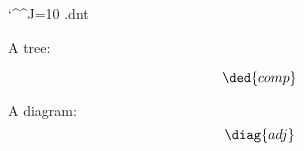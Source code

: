 \documentclass[oneside]{book}
\begin{document}
\ifluatex
  \catcode`\^^J=10
\else
  \jobname.dnt
  \def\pu{}
\fi

A tree:
%
%
\pu
$$\ded{comp}$$



\def\catA{\mathbf{A}}
\def\catB{\mathbf{B}}

A diagram:
%
$$\pu
  \diag{adj}
$$



\pu
\end{document}
